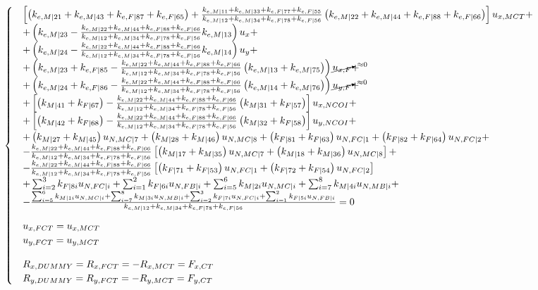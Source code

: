 \documentclass[a4paper]{jpconf}
\begin{document}
\begin{equation}
\begin{cases}
&\left[\left(k_{e,M|21}+k_{e,M|43}+k_{e,F|87}+k_{e,F|65}\right)+\frac{k_{e,M|11}+k_{e,M|33}+k_{e,F|77}+k_{e,F|55}}{k_{e,M|12}+k_{e,M|34}+k_{e,F|78}+k_{e,F|56}}\left(k_{e,M|22}+k_{e,M|44}+k_{e,F|88}+k_{e,F|66}\right)\right]u_{x,MCT}+\\
&+\left(k_{e,M|23}-\frac{k_{e,M|22}+k_{e,M|44}+k_{e,F|88}+k_{e,F|66}}{k_{e,M|12}+k_{e,M|34}+k_{e,F|78}+k_{e,F|56}}k_{e,M|13}\right)u_{x}+\\
&+\left(k_{e,M|24}-\frac{k_{e,M|22}+k_{e,M|44}+k_{e,F|88}+k_{e,F|66}}{k_{e,M|12}+k_{e,M|34}+k_{e,F|78}+k_{e,F|56}}k_{e,M|14}\right)u_{y}+\\
&+\left(k_{e,M|23}+k_{e,F|85}-\frac{k_{e,M|22}+k_{e,M|44}+k_{e,F|88}+k_{e,F|66}}{k_{e,M|12}+k_{e,M|34}+k_{e,F|78}+k_{e,F|56}}\left(k_{e,M|13}+k_{e,M|75}\right)\right)\cancelto{\approx 0}{u_{x,F}}+\\
&+\left(k_{e,M|24}+k_{e,F|86}-\frac{k_{e,M|22}+k_{e,M|44}+k_{e,F|88}+k_{e,F|66}}{k_{e,M|12}+k_{e,M|34}+k_{e,F|78}+k_{e,F|56}}\left(k_{e,M|14}+k_{e,M|76}\right)\right)\cancelto{\approx 0}{u_{y,F}}+\\
&+\left[\left(k_{M|41}+k_{F|67}\right)-\frac{k_{e,M|22}+k_{e,M|44}+k_{e,F|88}+k_{e,F|66}}{k_{e,M|12}+k_{e,M|34}+k_{e,F|78}+k_{e,F|56}}\left(k_{M|31}+k_{F|57}\right)\right]u_{x,NCOI}+\\
&+\left[\left(k_{M|42}+k_{F|68}\right)-\frac{k_{e,M|22}+k_{e,M|44}+k_{e,F|88}+k_{e,F|66}}{k_{e,M|12}+k_{e,M|34}+k_{e,F|78}+k_{e,F|56}}\left(k_{M|32}+k_{F|58}\right)\right]u_{y,NCOI}+\\
&+\left(k_{M|27}+k_{M|45}\right)u_{N,MC|7}+\left(k_{M|28}+k_{M|46}\right)u_{N,MC|8}+\left(k_{F|81}+k_{F|63}\right)u_{N,FC|1}+\left(k_{F|82}+k_{F|64}\right)u_{N,FC|2}+\\
&-\frac{k_{e,M|22}+k_{e,M|44}+k_{e,F|88}+k_{e,F|66}}{k_{e,M|12}+k_{e,M|34}+k_{e,F|78}+k_{e,F|56}}\left[\left(k_{M|17}+k_{M|35}\right)u_{N,MC|7}+\left(k_{M|18}+k_{M|36}\right)u_{N,MC|8}\right]+\\&
-\frac{k_{e,M|22}+k_{e,M|44}+k_{e,F|88}+k_{e,F|66}}{k_{e,M|12}+k_{e,M|34}+k_{e,F|78}+k_{e,F|56}}\left[\left(k_{F|71}+k_{F|53}\right)u_{N,FC|1}+\left(k_{F|72}+k_{F|54}\right)u_{N,FC|2}\right]\\
&+\sum_{i=2}^{3}k_{F|8i}u_{N,FC|i}+\sum_{i=1}^{2}k_{F|6i}u_{N,FB|i}+\sum_{i=5}^{6}k_{M|2i}u_{N,MC|i}+\sum_{i=7}^{8}k_{M|4i}u_{N,MB|i}+\\
&-\frac{\sum_{i=5}^{6}k_{M|1i}u_{N,MC|i}+\sum_{i=7}^{8}k_{M|3i}u_{N,MB|i}+\sum_{i=2}^{3}k_{F|7i}u_{N,FC|i}+\sum_{i=1}^{2}k_{F|5i}u_{N,FB|i}}{k_{e,M|12}+k_{e,M|34}+k_{e,F|78}+k_{e,F|56}}=0\\[10pt]

&u_{x,FCT}=u_{x,MCT}\\
&u_{y,FCT}=u_{y,MCT}\\[10pt]
&R_{x,DUMMY}=R_{x,FCT}=-R_{x,MCT}=F_{x,CT}\\
&R_{y,DUMMY}=R_{y,FCT}=-R_{y,MCT}=F_{y,CT}\\
\end{cases}
\end{equation}
\end{document}
